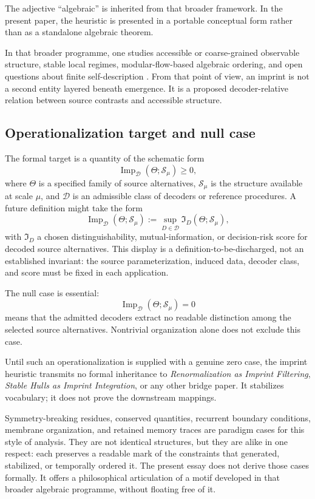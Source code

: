\documentclass[12pt,a4paper]{article}
\begin{document}
The adjective ``algebraic'' is inherited from that broader framework. In the present paper, the heuristic is presented in a portable conceptual form rather than as a standalone algebraic theorem.

In that broader programme, one studies accessible or coarse-grained
observable structure, stable local regimes, modular-flow-based algebraic
ordering, and open questions about finite self-description
\cite{Liu2026HAFF_A,Liu2026HAFF_C,Liu2026HAFF_G,Liu2026CS_III}. From
that point of view, an imprint is not a second entity layered beneath
emergence. It is a proposed decoder-relative relation between source
contrasts and accessible structure.

\subsection{Operationalization target and null case}

The formal target is a quantity of the schematic form
\[
\operatorname{Imp}_{\mathcal D}(\Theta;\mathcal S_\mu)\ge0,
\]
where \(\Theta\) is a specified family of source alternatives,
\(\mathcal S_\mu\) is the structure available at scale \(\mu\), and
\(\mathcal D\) is an admissible class of decoders or reference
procedures. A future definition might take the form
\[
\operatorname{Imp}_{\mathcal D}(\Theta;\mathcal S_\mu)
:=
\sup_{D\in\mathcal D}
\mathfrak I_D(\Theta;\mathcal S_\mu),
\]
with \(\mathfrak I_D\) a chosen distinguishability, mutual-information,
or decision-risk score for decoded source alternatives. This display is
a definition-to-be-discharged, not an established invariant: the source
parameterization, induced data, decoder class, and score must be fixed in
each application.

The null case is essential:
\[
\operatorname{Imp}_{\mathcal D}(\Theta;\mathcal S_\mu)=0
\]
means that the admitted decoders extract no readable distinction among
the selected source alternatives. Nontrivial organization alone does not
exclude this case.

Until such an operationalization is supplied with a genuine zero case,
the imprint heuristic transmits no formal inheritance to
\emph{Renormalization as Imprint Filtering}, \emph{Stable Hulls as
Imprint Integration}, or any other bridge paper. It stabilizes
vocabulary; it does not prove the downstream mappings.

Symmetry-breaking residues, conserved quantities, recurrent boundary conditions, membrane organization, and retained memory traces are paradigm cases for this style of analysis. They are not identical structures, but they are alike in one respect: each preserves a readable mark of the constraints that generated, stabilized, or temporally ordered it. The present essay does not derive those cases formally. It offers a philosophical articulation of a motif developed in that broader algebraic programme, without floating free of it.
\end{document}
